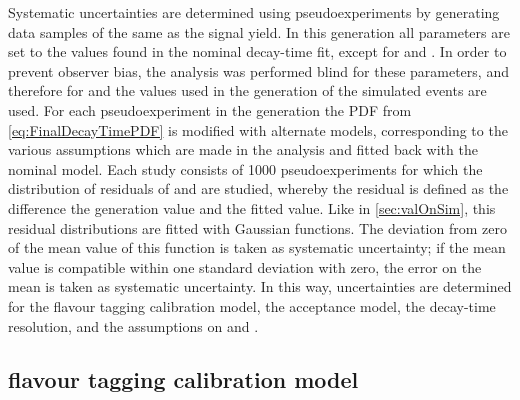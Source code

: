 Systematic uncertainties are determined using pseudoexperiments by generating data samples of the same as the \BdToDpi signal yield.
In this generation all parameters are set to the values found in the nominal decay-time fit, except for \Sf and \Sfbar.
In order to prevent observer bias, the analysis was performed blind for these parameters, and therefore for \Sf and \Sfbar the values used in the generation of the simulated events are used.
For each pseudoexperiment in the generation the PDF from \cref{eq:FinalDecayTimePDF} is modified with alternate models, corresponding to the various assumptions which are made in the analysis and fitted back with the nominal model.
Each study consists of \num{1000} pseudoexperiments for which the distribution of residuals of \Sf and \Sfbar are studied, whereby the residual is defined as the difference the generation value and the fitted value.
Like in \cref{sec:valOnSim}, this residual distributions are fitted with Gaussian functions.
The deviation from zero of the mean value of this function is taken as systematic uncertainty; if the mean value is compatible within one standard deviation with zero, the error on the mean is taken as systematic uncertainty.
In this way, uncertainties are determined for the flavour tagging calibration model, the acceptance model, the decay-time resolution, and the assumptions on \DG and \Cf.

\subsection*{flavour tagging calibration model}

